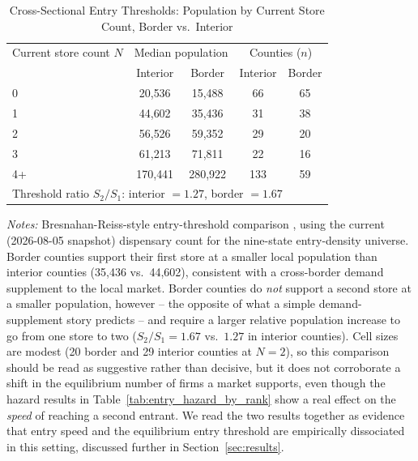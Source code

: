 \begin{table}[htbp]
\centering
\caption{Cross-Sectional Entry Thresholds: Population by Current Store Count, Border vs.\ Interior}
\label{tab:entry_threshold}
\begin{tabular}{lcccc}
\toprule
Current store count $N$ & \multicolumn{2}{c}{Median population} & \multicolumn{2}{c}{Counties ($n$)} \\
& Interior & Border & Interior & Border \\
\midrule
0 & 20{,}536 & 15{,}488 & 66 & 65 \\
1 & 44{,}602 & 35{,}436 & 31 & 38 \\
2 & 56{,}526 & 59{,}352 & 29 & 20 \\
3 & 61{,}213 & 71{,}811 & 22 & 16 \\
4+ & 170{,}441 & 280{,}922 & 133 & 59 \\
\midrule
\multicolumn{5}{l}{Threshold ratio $S_2/S_1$: interior $=1.27$, border $=1.67$} \\
\bottomrule
\end{tabular}
\begin{minipage}{0.95\textwidth}
\vspace{0.3em}
\footnotesize
\textit{Notes:} Bresnahan-Reiss-style entry-threshold comparison \citep{BresnahanReiss1990,BresnahanReiss1991},
using the current (2026-08-05 snapshot) dispensary count for the nine-state entry-density universe. Border
counties support their first store at a smaller local population than interior counties (35{,}436 vs.\
44{,}602), consistent with a cross-border demand supplement to the local market. Border counties do
\emph{not} support a second store at a smaller population, however -- the opposite of what a simple
demand-supplement story predicts -- and require a larger relative population increase to go from one store
to two ($S_2/S_1=1.67$ vs.\ $1.27$ in interior counties). Cell sizes are modest (20 border and 29 interior
counties at $N=2$), so this comparison should be read as suggestive rather than decisive, but it does not
corroborate a shift in the equilibrium number of firms a market supports, even though the hazard results in
Table~\ref{tab:entry_hazard_by_rank} show a real effect on the \emph{speed} of reaching a second entrant. We
read the two results together as evidence that entry speed and the equilibrium entry threshold are
empirically dissociated in this setting, discussed further in Section~\ref{sec:results}.
\end{minipage}
\end{table}
